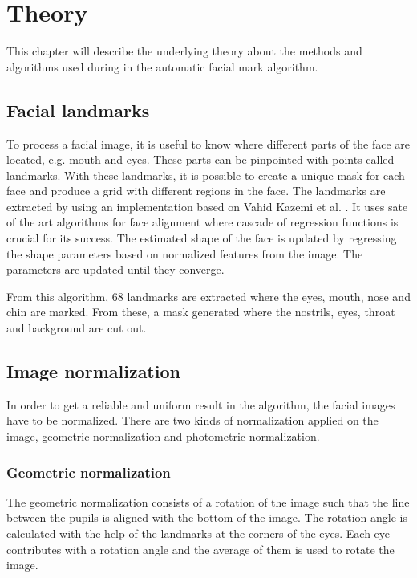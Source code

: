 \chapter{Theory}\label{cha:theory}

This chapter will describe the underlying theory about the methods and algorithms used during in the automatic facial mark algorithm. 

\section{Facial landmarks} \label{sec:landmarks} 

To process a facial image, it is useful to know where different parts of the face are located, e.g. mouth and eyes. These parts can be pinpointed with points called landmarks. With these landmarks, it is possible to create a unique mask for each face and produce a grid with different regions in the face. The landmarks are extracted by using an implementation based on Vahid Kazemi et al. \cite{dlib_landmark}. It uses sate of the art algorithms for face alignment where cascade of regression functions is crucial for its success. The estimated shape of the face is updated by regressing the shape parameters based on normalized features from the image. The parameters are updated until they converge.

From this algorithm, 68 landmarks are extracted where the eyes, mouth, nose and chin are marked. From these, a mask generated where the nostrils, eyes, throat and background are cut out. 

\section{Image normalization} \label{sec:normalization} 

In order to get a reliable and uniform result in the algorithm, the facial images have to be normalized. There are two kinds of normalization applied on the image, geometric normalization and photometric normalization.  

\subsection{Geometric normalization} \label{subsec:geo_norm} 
The geometric normalization consists of a rotation of the image such that the line between the pupils is aligned with the bottom of the image. The rotation angle is calculated with the help of the landmarks at the corners of the eyes. Each eye contributes with a rotation angle and the average of them is used to rotate the image.

